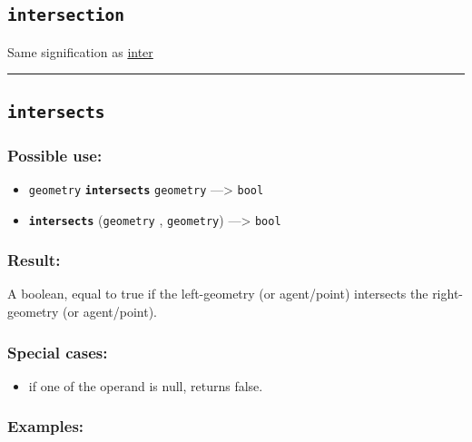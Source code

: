 \documentclass[]{book}
\providecommand{\tightlist}{%
  \setlength{\itemsep}{0pt}\setlength{\parskip}{0pt}}
\theoremstyle{definition}
\theoremstyle{definition}
\theoremstyle{definition}
\theoremstyle{remark}
\begin{document}
\subsection{\texorpdfstring{\texttt{intersection}}{intersection}}\label{intersection}

Same signification as \href{OperatorsIM\#inter}{inter}

\begin{center}\rule{0.5\linewidth}{\linethickness}\end{center}

\subsection{\texorpdfstring{\texttt{intersects}}{intersects}}\label{intersects}

\subsubsection{Possible use:}\label{possible-use-282}

\begin{itemize}
\tightlist
\item
  \texttt{geometry} \textbf{\texttt{intersects}} \texttt{geometry}
  ---\textgreater{} \texttt{bool}
\item
  \textbf{\texttt{intersects}} (\texttt{geometry} , \texttt{geometry})
  ---\textgreater{} \texttt{bool}
\end{itemize}

\subsubsection{Result:}\label{result-272}

A boolean, equal to true if the left-geometry (or agent/point)
intersects the right-geometry (or agent/point).

\subsubsection{Special cases:}\label{special-cases-81}

\begin{itemize}
\tightlist
\item
  if one of the operand is null, returns false.
\end{itemize}

\subsubsection{Examples:}\label{examples-212}
\end{document}
